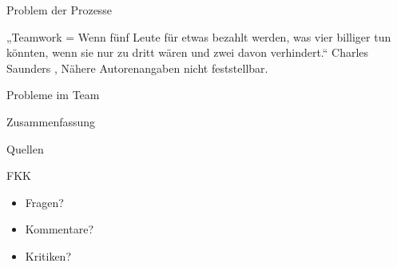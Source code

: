 \documentclass[10pt]{beamer}
\begin{document}
	
	\begin{frame}{Problem der Prozesse}
			
	\end{frame}
	
	\thispagestyle{empty}
	\begin{frame}
		„Teamwork = Wenn fünf Leute für etwas bezahlt werden, was vier billiger tun könnten, wenn sie nur zu dritt wären und zwei davon verhindert.“
Charles Saunders , Nähere Autorenangaben nicht feststellbar.
	\end{frame}

	
	\begin{frame}{Probleme im Team}
		
	\end{frame}

	\begin{frame}{Zusammenfassung}
		
	\end{frame}
	
	\begin{frame}{Quellen}
		
	\end{frame}

	\begin{frame}{FKK}
		\begin{itemize}
			\item{Fragen?}
			\item{Kommentare?}
			\item{Kritiken?}
		\end{itemize}

	\end{frame}
\end{document}
